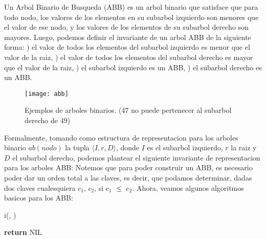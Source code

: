 \documentclass[10pt,a4paper]{article}
\begin{document}
Un Arbol Binario de Busqueda (ABB) es un arbol binario que satisface que para todo nodo, los valores de los elementos en su subarbol izquierdo son menores que el valor de ese nodo, y los valores de los elementos de su subarbol derecho son mayores. Luego, podemos definir el invariante de un arbol ABB de la siguiente forma:
\newline
{}) el valor de todos los elementos del subarbol izquierdo es menor que el valor de la raiz,
\newline
{}) el valor de todos los elementos del subarbol derecho es mayor que el valor de la raiz,
\newline
{}) el subarbol izquierdo es un ABB,
\newline
{}) el subarbol derecho es un ABB.

\begin{figure}[h]
	\centering
	\texttt{[image: abb]}
	\caption{Ejemplos de arboles binarios. (47 no puede pertenecer al subarbol derecho de 49)}
	\label{drivers1}
\end{figure}
\newpage

Formalmente, tomando como estructura de representacion para los arboles binario $ab(nodo)$ la tupla $\langle$$I, r, D$$\rangle$, donde $I$ es el subarbol izquierdo, $r$ la raiz y $D$ el subarbol derecho, podemos plantear el siguiente invariante de representacion para los arboles ABB:
\newline
{}
\medskip
\medskip
\medskip
Notemos que para poder construir un ABB, es necesario poder dar un orden total a las claves, es decir, que podamos determinar, dadas dos claves cualesquiera $c_{1}$, $c_{2}$, si $c_{1}$ $\leq$ $c_{2}$. Ahora, veamos algunos algoritmos basicos para los ABB:

\begin{algorithm}[H]{i(\In{}{$\secuvacia$}, )}
	\begin{algorithmic}[1]
		\State \textbf{return} NIL 
		
		\medskip
	\end{algorithmic}
\end{algorithm}
\end{document}
